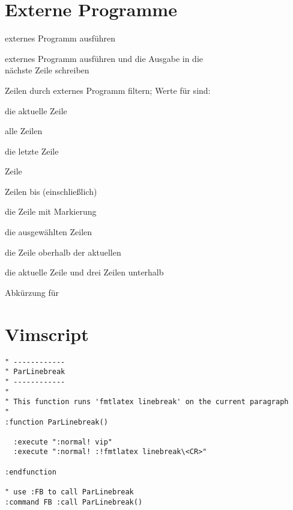 \documentclass
[
  draft    = true,
  fontsize = 11pt,
  parskip  = half,
  BCOR     = 0pt,
  DIV      = calc,
  ngerman
]
{scrartcl}
\begin{document}
\section{Externe Programme}
\begin{mytemize}
  \item {}  externes Programm  ausführen
  \item {} externes Programm  ausführen und die Ausgabe in die\\
        \vimcmd{}{}{}     nächste Zeile schreiben
  \item {} Zeilen  durch externes Programm  filtern;
                          Werte für  sind:
                          \begin{mytemize}
                            \renewcommand{\labelitemii}{$\blacktriangleright$}
                            \addtolength{\leftskip}{\cmdwidth}
                            \item {}     die aktuelle Zeile
                            \item \vimcmd{}{\%}{}    alle Zeilen
                            \item \vimcmd{}{\$}{}    die letzte Zeile
                            \item {}     Zeile 
                            \item {}   Zeilen  bis  (einschließlich)
                            \item {}    die Zeile mit Markierung 
                            \item {} die ausgewählten Zeilen
                            \item {}   die Zeile oberhalb der aktuellen
                            \item {}  die aktuelle Zeile und drei Zeilen unterhalb
                          \end{mytemize}
  \item \vimcmd{}{!!}{}   Abkürzung für 
\end{mytemize}

\section{Vimscript}
\begin{small}
\begin{verbatim}
" ------------
" ParLinebreak
" ------------
"
" This function runs 'fmtlatex linebreak' on the current paragraph
"
:function ParLinebreak()

  :execute ":normal! vip"
  :execute ":normal! :!fmtlatex linebreak\<CR>"

:endfunction

" use :FB to call ParLinebreak
:command FB :call ParLinebreak()
\end{verbatim}
\end{small}
\end{document}

